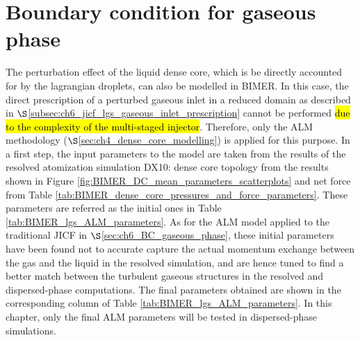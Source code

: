 



\section{Boundary condition for gaseous phase}
\label{sec:ch9_BIMER_BCs_for_gaseous_phase}

The perturbation effect of the liquid dense core, which is be directly accounted for by the lagrangian droplets, can also be modelled in BIMER. In this case, the direct prescription of a perturbed gaseous inlet in a reduced domain as described in $\S$\ref{subsec:ch6_jicf_lgs_gaseous_inlet_prescription} cannot be performed \hl{due to the complexity of the multi-staged injector}. Therefore, only the ALM methodology ($\S$\ref{sec:ch4_dense_core_modelling}) is applied for this purpose. In a first step, the input parameters to the model are taken from the results of the resolved atomization simulation DX10: dense core topology from the results shown in Figure \ref{fig:BIMER_DC_mean_parameters_scatterplots} and net force from Table \ref{tab:BIMER_dense_core_pressures_and_force_parameters}.  These parameters are referred as the initial ones in Table \ref{tab:BIMER_lgs_ALM_parameters}. As for the ALM model applied to the traditional JICF in $\S$\ref{sec:ch6_BC_gaseous_phase}, these initial parameters have been found not to accurate capture the actual momentum exchange between the gas and the liquid in the resolved simulation, and are hence tuned to find a better match between the turbulent gaseous structures in the resolved and dispersed-phase computations. The final parameters obtained are shown in the corresponding column of Table \ref{tab:BIMER_lgs_ALM_parameters}. In this chapter, only the final ALM parameters will be tested in dispersed-phase simulations.


